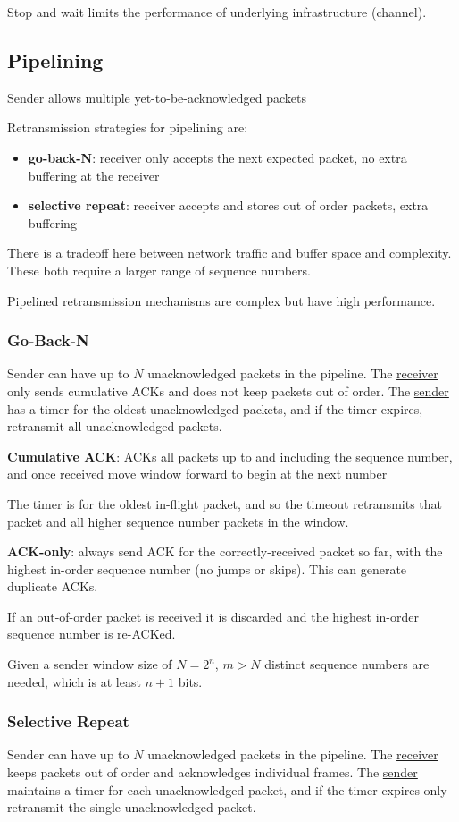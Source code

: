 \documentclass[11pt]{article}
\begin{document}
Stop and wait limits the performance of underlying infrastructure (channel).
\subsection{Pipelining}
\label{sec:org815bcb9}
Sender allows multiple yet-to-be-acknowledged packets

Retransmission strategies for pipelining are:
\begin{itemize}
\item \textbf{go-back-N}: receiver only accepts the next expected packet, no extra buffering at the receiver
\item \textbf{selective repeat}: receiver accepts and stores out of order packets, extra buffering
\end{itemize}

There is a tradeoff here between network traffic and buffer space and complexity.
These both require a larger range of sequence numbers.

Pipelined retransmission mechanisms are complex but have high performance.
\subsubsection{Go-Back-N}
\label{sec:org54d25e0}
Sender can have up to \(N\) unacknowledged packets in the pipeline.
The \uline{receiver} only sends cumulative ACKs and does not keep packets out of order.
The \uline{sender} has a timer for the oldest unacknowledged packets, and if the timer expires,
retransmit all unacknowledged packets.

\textbf{Cumulative ACK}: ACKs all packets up to and including the sequence number, and once received
move window forward to begin at the next number

The timer is for the oldest in-flight packet, and so the timeout retransmits that packet and all
higher sequence number packets in the window.

\textbf{ACK-only}: always send ACK for the correctly-received packet so far, with the highest in-order
sequence number (no jumps or skips).
This can generate duplicate ACKs.

If an out-of-order packet is received it is discarded and the highest in-order sequence number is
re-ACKed.

Given a sender window size of \(N = 2^{n}\), \(m>N\) distinct sequence numbers are needed,
which is at least \(n+1\) bits.
\subsubsection{Selective Repeat}
\label{sec:org52f1386}
Sender can have up to \(N\) unacknowledged packets in the pipeline.
The \uline{receiver} keeps packets out of order and acknowledges individual frames.
The \uline{sender} maintains a timer for each unacknowledged packet, and if the timer expires only
retransmit the single unacknowledged packet.
\end{document}
